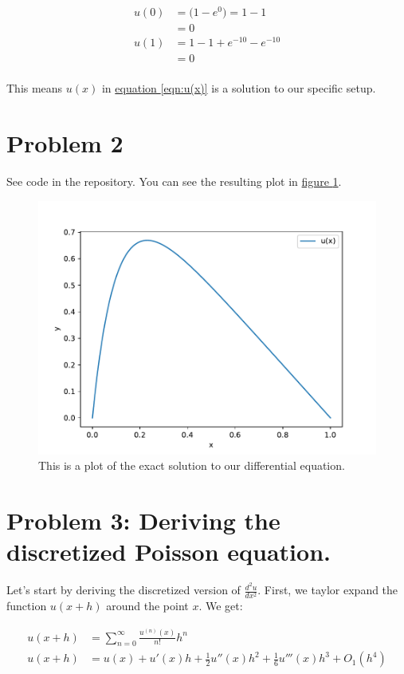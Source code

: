 \documentclass[english,notitlepage]{article}  %
\begin{document}
  \begin{equation}
    \begin{split}
      u(0) &= \big( 1 - e^0 \big) = 1-1 \\
      &= 0 \\
      u(1) &= 1-1+e^{-10} - e^{-10} \\
      &= 0 \\
    \end{split}
  \end{equation}

  This means $u(x)$ in \hyperref[eqn:u(x)]{equation \ref*{eqn:u(x)}}
   is a solution to our specific setup.

\section*{Problem 2}

See code in the repository. You can see the resulting plot in \hyperref[fig:problem2]{figure
\ref*{fig:problem2}}.

\begin{figure}[H]
  \centering
  \includegraphics[width=0.6\linewidth]{../Code/Problem_2_plot.pdf}
  \caption{This is a plot of the exact solution to our differential equation.}
  \label{fig:problem2}
\end{figure}


\section*{Problem 3: Deriving the discretized Poisson equation.}

    Let's start by deriving the discretized version of $\frac{d^2u}{dx^2}$. First,
    we taylor expand the function $u(x+h)$ around the point $x$. We get:

    \begin{align*}
        u(x+h) &= \sum_{n=0}^{\infty} \frac{u^{(n)}(x)}{n!} h^n
        \\
        u(x+h) &= u(x) + u'(x) h + \frac{1}{2} u''(x) h^2 + \frac{1}{6} u'''(x) h^3 + O_1(h^4)
    \end{align*}
\end{document}
